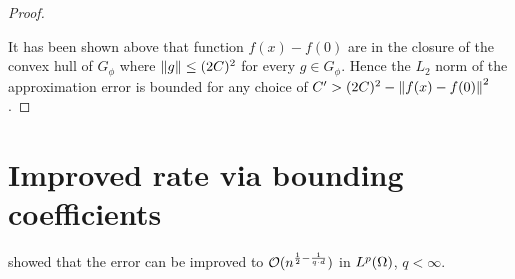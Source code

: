 \begin{proof}
\begin{lemma}
    \end{lemma}


    It has been shown above that function $f(x) - f(0)$ are in the closure of
    the convex hull of $G_{\phi}$ where $\left\| g \right\| \leq (2C)^2$ for every $g \in
    G_{\phi}$. Hence the $L_2$ norm of the approximation error is bounded for
    any choice of $C' > (2C)^2 - \left\| f(x) - f(0) \right\|^2$.




\end{proof}



\section{Improved rate via bounding coefficients}
\label{sec:improved_heaviside}


\cite{makovozRandomApproximantsNeural1996} showed that the error can be improved
to $\mathcal{O}(n^{\frac{1}{2} - \frac{1}{q\cdot d}})$ in $L^{p}(\Omega)$, $q <
\infty$.

